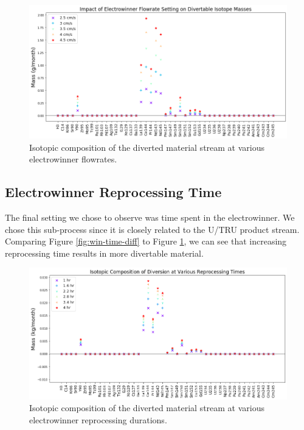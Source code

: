 \begin{figure}
	\includegraphics[width=\linewidth]{images/flowrate-sa-diff}
	\caption{Isotopic composition of the diverted material stream at various electrowinner flowrates.}
	\label{fig:win-flow-diff}
\end{figure}

\subsection{Electrowinner Reprocessing Time}

The final setting we chose to observe was time spent in the electrowinner. We chose this sub-process since it is closely related to the U/TRU product stream. Comparing Figure \ref{fig:win-time-diff} to Figure \ref{fig:win-flow-diff}, we can see that increasing 
reprocessing time results in more divertable material. 

\begin{figure}
	\includegraphics[width=\linewidth]{images/time-sa-comp}
	\caption{Isotopic composition of the diverted material stream at various electrowinner reprocessing durations.}
	\label{fig:win-time-sa}
\end{figure}

